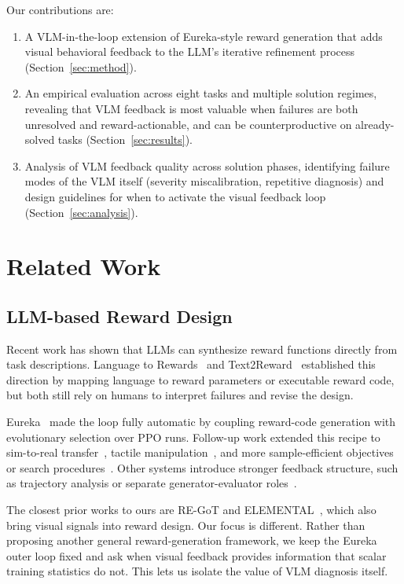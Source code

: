 \documentclass[conference]{IEEEtran}
\begin{document}
Our contributions are:
\begin{enumerate}
  \item A VLM-in-the-loop extension of Eureka-style reward generation that adds
    visual behavioral feedback to the LLM's iterative refinement process
    (Section~\ref{sec:method}).
  \item An empirical evaluation across eight tasks and multiple solution
    regimes, revealing that VLM feedback is most valuable when failures are both
    unresolved and reward-actionable, and can be counterproductive on
    already-solved tasks
    (Section~\ref{sec:results}).
  \item Analysis of VLM feedback quality across solution phases,
    identifying failure modes of the VLM itself (severity miscalibration,
    repetitive diagnosis) and design guidelines for when to activate the visual
    feedback loop (Section~\ref{sec:analysis}).
\end{enumerate}


\section{Related Work}

\subsection{LLM-based Reward Design}

Recent work has shown that LLMs can synthesize reward functions directly from
task descriptions. Language to Rewards~\cite{yu2023language} and
Text2Reward~\cite{xie2024text2reward} established this direction by mapping
language to reward parameters or executable reward code, but both still rely on
humans to interpret failures and revise the design.

Eureka~\cite{ma2024eureka} made the loop fully automatic by coupling reward-code
generation with evolutionary selection over PPO runs. Follow-up work extended
this recipe to sim-to-real transfer~\cite{ma2024dreureka}, tactile
manipulation~\cite{field2025text2touch}, and more sample-efficient objectives or
search procedures~\cite{sarukkai2024progresscounts,hazra2025revolve,gao2026rfagent}.
Other systems introduce stronger feedback structure, such as trajectory analysis
or separate generator-evaluator roles~\cite{li2024auto,sun2025card}.

The closest prior works to ours are RE-GoT and
ELEMENTAL~\cite{yao2025regot,chen2025elemental}, which also bring visual signals
into reward design. Our focus is different. Rather than proposing another
general reward-generation framework, we keep the Eureka outer loop fixed and ask
when visual feedback provides information that scalar training statistics do
not. This lets us isolate the value of VLM diagnosis itself.
\end{document}

